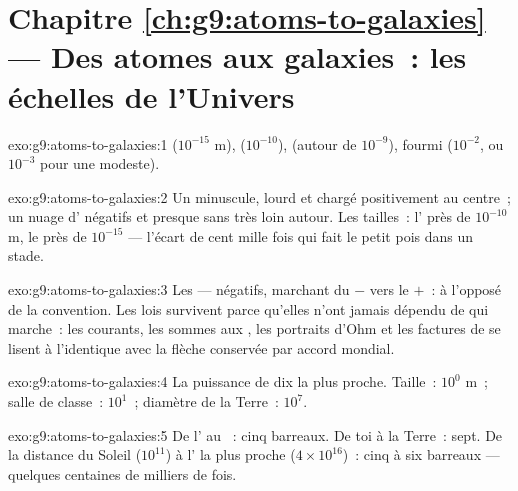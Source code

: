 \section*{Chapitre \ref{ch:g9:atoms-to-galaxies} --- Des atomes aux galaxies~: les échelles de l'Univers}

\begin{solution}{exo:g9:atoms-to-galaxies:1}
 ($10^{-15}$ \unit{m}),  ($10^{-10}$),  (autour de
$10^{-9}$), fourmi ($10^{-2}$, ou $10^{-3}$ pour une modeste).
\end{solution}

\begin{solution}{exo:g9:atoms-to-galaxies:2}
Un  minuscule, lourd et chargé positivement au centre~; un nuage
d' négatifs et presque sans  très loin autour. Les
tailles~: l' près de $10^{-10}$ \unit{m}, le  près de
$10^{-15}$ --- l'écart de cent mille fois qui fait le petit pois dans
un stade.
\end{solution}

\begin{solution}{exo:g9:atoms-to-galaxies:3}
Les  --- négatifs, marchant du $-$ vers le $+$~: à l'opposé
de la convention. Les lois survivent parce qu'elles n'ont jamais
dépendu de qui marche~: les courants, les sommes aux , les
portraits d'Ohm et les factures de  se lisent à l'identique
avec la flèche conservée par accord mondial.
\end{solution}

\begin{solution}{exo:g9:atoms-to-galaxies:4}
La puissance de dix la plus proche. Taille~: $10^{0}$ \unit{m}~;
salle de classe~: $10^{1}$~; diamètre de la Terre~: $10^{7}$.
\end{solution}

\begin{solution}{exo:g9:atoms-to-galaxies:5}
De l' au ~: cinq barreaux. De toi à la Terre~: sept. De la
distance du Soleil ($10^{11}$) à l' la plus proche
($4 \times 10^{16}$)~: cinq à six barreaux --- quelques centaines de
milliers de fois.
\end{solution}


